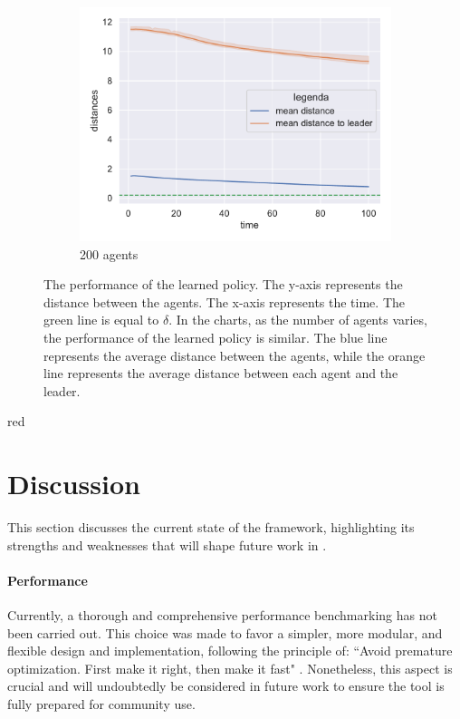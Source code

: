 \documentclass[12pt,a4paper,openright,twoside]{book}
\begin{document}
\begin{figure}[h!]
\begin{subfigure}[b]{0.32\textwidth}
        \includegraphics[width=\textwidth]{figures/data-ftl-200.pdf}
        \caption{200 agents}
    \end{subfigure}
\caption{The performance of the learned policy. 
The y-axis represents the distance between the agents.
The x-axis represents the time.
The green line is equal to $\delta$.
In the charts, as the number of agents varies, the performance of the learned policy is similar.
The blue line represents the average distance between the agents, while the orange line represents
the average distance between each agent and the leader.
}
\label{fig:test-ftl}
\end{figure}

\begin{color}{red}
\section{Discussion}
\end{color}
 
This section discusses the current state of the framework, highlighting its strengths and weaknesses
    that will shape future work in .

    
\paragraph{Performance} 
Currently, a thorough and comprehensive performance benchmarking has not been carried out. This choice was made to 
    favor a simpler, more modular, and flexible design and implementation, following the principle of:
    ``Avoid premature optimization. First make it right, then make it fast" \cite{hyde2006fallacy}.
    Nonetheless, this aspect is crucial and will undoubtedly be considered in future work to ensure the tool is 
    fully prepared for community use.
\end{document}
